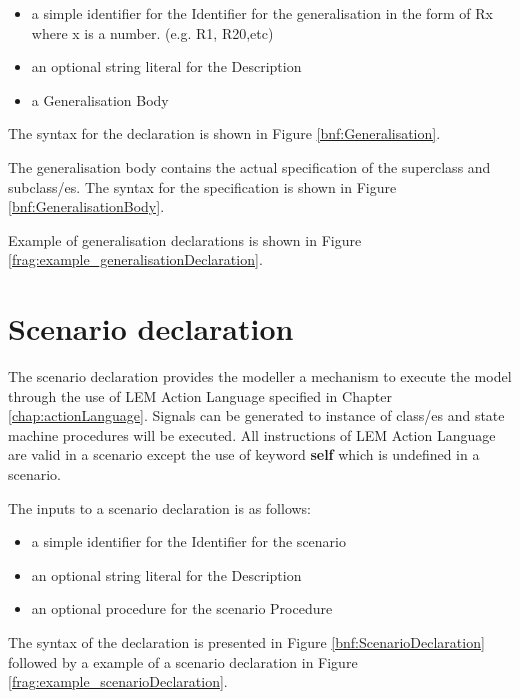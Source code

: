 \begin{itemize}
\item a simple identifier for the Identifier for the generalisation in the form of Rx where x is a number. (e.g. R1, R20,etc) 
\item an optional string literal for the Description
\item a Generalisation Body
\end{itemize}

The syntax for the declaration is shown in Figure \ref{bnf:Generalisation}.

The generalisation body contains the actual specification of the superclass and subclass/es. The syntax for the specification is shown in Figure \ref{bnf:GeneralisationBody}.


Example of generalisation declarations is shown in Figure \ref{frag:example_generalisationDeclaration}.


\section{Scenario declaration}\label{sec:scenarioDeclaration}
The scenario declaration provides the modeller a mechanism to execute the model through the use of LEM Action Language specified in Chapter \ref{chap:actionLanguage}. Signals can be generated to instance of class/es and state machine procedures will be executed. All instructions of LEM Action Language are valid in a scenario except the use of keyword \textbf{self} which is undefined in a scenario. 

The inputs to a scenario declaration is as follows:
\begin{itemize}
\item a simple identifier for the Identifier for the scenario
\item an optional string literal for the Description
\item an optional procedure for the scenario Procedure
\end{itemize}

The syntax of the declaration is presented in Figure \ref{bnf:ScenarioDeclaration} followed by a example of a scenario declaration in Figure \ref{frag:example_scenarioDeclaration}.


